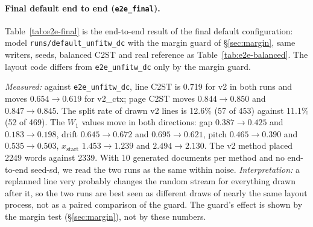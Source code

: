 \documentclass[11pt,a4paper]{article}
\newcommand{\src}[1]{{\footnotesize\texttt{#1}}}
\begin{document}
\paragraph{Final default end to end (\texttt{e2e\_final}).}
Table~\ref{tab:e2e-final} is the end-to-end result of the final default
configuration: model \texttt{runs/default\_unfitw\_dc} with the margin guard
of \S\ref{sec:margin}, same writers, seeds, balanced C2ST and real reference
as Table~\ref{tab:e2e-balanced}. The layout code differs from
\texttt{e2e\_unfitw\_dc} only by the margin guard.
\begin{table}[H]\centering
{}
\caption{\textbf{Final default end-to-end result} (\src{runs/e2e\_final/results.md}):
default model \texttt{default\_unfitw\_dc} plus the margin guard; balanced
C2ST; 5 writers $\times$ 2 seeds; real reference 193 test pages. All $W_1$
values are on the lines that survive extraction (survivor bias, see above).
Against the drawn lines (\src{split\_diag.py}, v2): 57 of 453 drawn lines
split (12.6\%), 80 single-piece extracted lines, 69 extra fragments.}
\label{tab:e2e-final}
\end{table}
\emph{Measured:} against \texttt{e2e\_unfitw\_dc}, line C2ST is 0.719 for v2
in both runs and moves $0.654\to0.619$ for v2\_ctx; page C2ST moves
$0.844\to0.850$ and $0.847\to0.845$. The split rate of drawn v2 lines is
12.6\% (57 of 453) against 11.1\% (52 of 469). The $W_1$ values move in both
directions: gap $0.387\to0.425$ and $0.183\to0.198$, drift $0.645\to0.672$
and $0.695\to0.621$, pitch $0.465\to0.390$ and $0.535\to0.503$,
$x_\text{start}$ $1.453\to1.239$ and $2.494\to2.130$. The v2 method placed
2249 words against 2339. With 10 generated documents per method and no
end-to-end seed-sd, we read the two runs as the same within noise.
\emph{Interpretation:} a replanned line very probably changes the random
stream for everything drawn after it, so the two runs are best seen as
different draws of nearly the same layout process, not as a paired
comparison of the guard. The guard's effect is shown by the margin test
(\S\ref{sec:margin}), not by these numbers.
\end{document}
